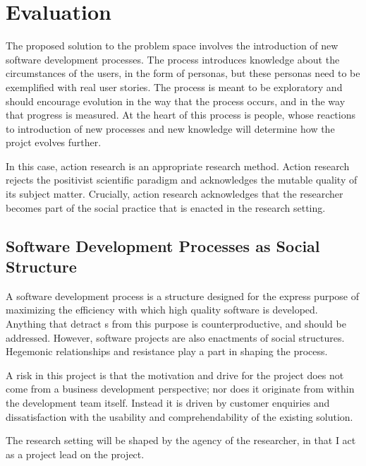 
\section{Evaluation} %
\label{sec:evaluation}

The proposed solution to the problem space involves the introduction of new software development processes. The process introduces knowledge about the circumstances of the users, in the form of personas, but these personas need to be exemplified with real user stories. The process is meant to be exploratory and should encourage evolution in the way that the process occurs, and in the way that progress is measured. At the heart of this process is people, whose reactions to introduction of new processes and new knowledge will determine how the projct evolves further.

In this case, action research is an appropriate research method. Action research rejects the positivist scientific paradigm and acknowledges the mutable quality of its subject matter. Crucially, action research acknowledges that the researcher becomes part of the social practice that is enacted in the research setting.


\subsection{Software Development Processes as Social Structure} %
\label{sub:software_development_processes_as_social_structure}

A software development process is a structure designed for the express purpose of maximizing the efficiency with which high quality software is developed. Anything that detract s from this purpose is counterproductive, and should be addressed. However, software projects are also enactments of social structures. Hegemonic relationships and resistance play a part in shaping the process. 

A risk in this project is that the motivation and drive for the project does not come from a business development perspective; nor does it originate from within the development team itself. Instead it is driven by customer enquiries and dissatisfaction with the usability and comprehendability of the existing solution. 

The research setting will be shaped by the agency of the researcher, in that I act as a project lead on the project.



